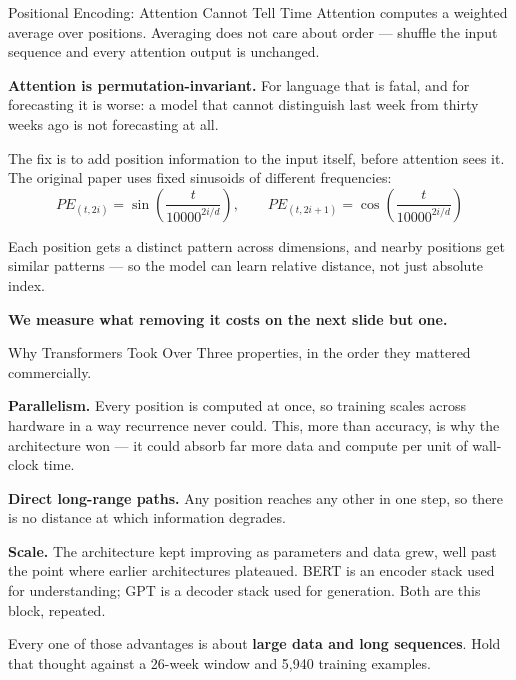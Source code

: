 \documentclass[aspectratio=169, 11pt]{beamer}
\begin{document}
\begin{frame}{Positional Encoding: Attention Cannot Tell Time}
  Attention computes a weighted average over positions. Averaging does not care about order ---
  shuffle the input sequence and every attention output is unchanged.

  \vspace{0.15cm}
  \textbf{Attention is permutation-invariant.} For language that is fatal, and for forecasting it
  is worse: a model that cannot distinguish last week from thirty weeks ago is not forecasting at
  all.

  \vspace{0.15cm}
  The fix is to add position information to the input itself, before attention sees it. The
  original paper uses fixed sinusoids of different frequencies:
  \[
    PE_{(t, 2i)} = \sin\!\left(\frac{t}{10000^{2i/d}}\right),
    \qquad
    PE_{(t, 2i+1)} = \cos\!\left(\frac{t}{10000^{2i/d}}\right)
  \]
  \vspace{-0.3cm}

  Each position gets a distinct pattern across dimensions, and nearby positions get similar
  patterns --- so the model can learn relative distance, not just absolute index.

  \vspace{0.1cm}
  \textbf{We measure what removing it costs on the next slide but one.}
\end{frame}

\begin{frame}{Why Transformers Took Over}
  Three properties, in the order they mattered commercially.

  \vspace{0.1cm}
  \textbf{Parallelism.} Every position is computed at once, so training scales across hardware in
  a way recurrence never could. This, more than accuracy, is why the architecture won --- it
  could absorb far more data and compute per unit of wall-clock time.

  \vspace{0.15cm}
  \textbf{Direct long-range paths.} Any position reaches any other in one step, so there is no
  distance at which information degrades.

  \vspace{0.15cm}
  \textbf{Scale.} The architecture kept improving as parameters and data grew, well past the
  point where earlier architectures plateaued. BERT \parencite{Devlin2019} is an encoder stack
  used for understanding; GPT is a decoder stack used for generation. Both are this block,
  repeated.

  \begin{warningbox}
    Every one of those advantages is about \textbf{large data and long sequences}. Hold that
    thought against a 26-week window and 5{,}940 training examples.
  \end{warningbox}
\end{frame}
\end{document}

